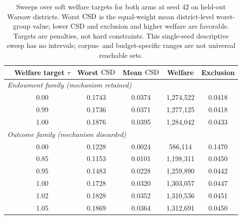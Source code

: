 \begin{table}[t]
\centering\small
\begin{tabular}{lccccc}
\toprule
& Welfare target $\tau$ & Worst $\mathrm{CSD}$ & Mean $\mathrm{CSD}$ & Welfare & Exclusion \\
\midrule
\multicolumn{6}{l}{\emph{Endowment family (mechanism retained)}}\\
& 0.00 & 0.1743 & 0.0374 & 1,274,522 & 0.0418 \\
& 0.99 & 0.1736 & 0.0371 & 1,277,125 & 0.0418 \\
& 1.00 & 0.1876 & 0.0395 & 1,284,042 & 0.0433 \\
\midrule
\multicolumn{6}{l}{\emph{Outcome family (mechanism discarded)}}\\
& 0.00 & 0.1228 & 0.0024 & 586,114 & 0.1470 \\
& 0.85 & 0.1153 & 0.0101 & 1,198,311 & 0.0450 \\
& 0.95 & 0.1483 & 0.0228 & 1,259,890 & 0.0442 \\
& 1.00 & 0.1728 & 0.0320 & 1,303,057 & 0.0447 \\
& 1.02 & 0.1828 & 0.0352 & 1,310,536 & 0.0451 \\
& 1.05 & 0.1869 & 0.0364 & 1,312,691 & 0.0450 \\
\bottomrule
\end{tabular}
\caption{Sweeps over soft welfare targets for both arms at seed 42 on held-out Warsaw districts. Worst $\mathrm{CSD}$ is the equal-weight mean district-level worst-group value; lower CSD and exclusion and higher welfare are favorable. Targets are penalties, not hard constraints. This single-seed descriptive sweep has no intervals; corpus- and budget-specific ranges are not universal reachable sets.}
\label{tab:endowfrontier}
\end{table}
